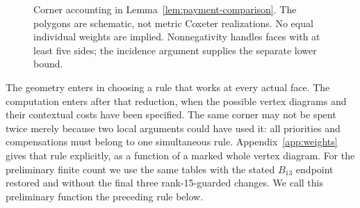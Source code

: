 \documentclass[11pt]{article}
\theoremstyle{remark}\newtheorem{remark}[theorem]{Remark}
\begin{document}
\begin{figure}[tbp]
\centering
{}
\caption{Corner accounting in Lemma~\ref{lem:payment-comparison}.
The polygons are schematic, not metric Coxeter realizations. No equal
individual weights are implied. Nonnegativity handles faces with at least
five sides; the incidence argument supplies the separate lower bound.}
\label{fig:ill20261026:fv57:corners}
\end{figure}
The geometry enters in choosing a rule that works at every actual
face. The computation enters after that reduction, when the possible
vertex diagrams and their contextual costs have been specified.
The same corner may not be spent twice merely because two local
arguments could have used it: all priorities and compensations must
belong to one simultaneous rule.
Appendix~\ref{app:weights} gives that rule explicitly, as a function
of a marked whole vertex diagram. For the preliminary finite count
we use the same tables with the stated $B_{13}$ endpoint restored
and without the final three rank-15-guarded changes. We call this
preliminary function the preceding rule below.
\end{document}
